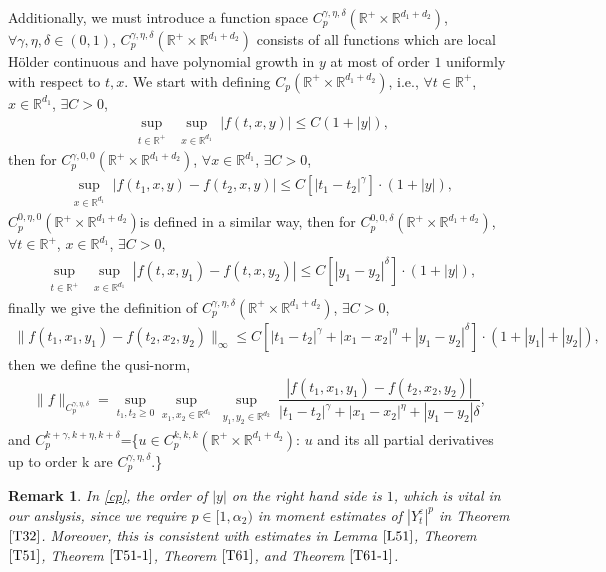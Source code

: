 \documentclass[11pt,reqno]{amsart}
\newtheorem{remark}{\indent Remark}[section]
\numberwithin{equation}{section}
\newcommand{\R}{\mathbb{R}}
\newcommand{\ga}{\gamma}
\newcommand{\de}{\delta}
\newcommand{\mb}{\mathbb}
\begin{document}
Additionally, we must introduce a function space $C^{\gamma,\eta,\delta}_p(\mb{R}^{+}\times\mathbb{R}^{d_{1}+d_{2}})$, $\forall \gamma, \eta, \delta\in(0,1)$,  $C^{\gamma,\eta,\delta}_p(\mb{R}^{+}\times\mathbb{R}^{d_{1}+d_{2}})$ consists of all functions which are local H\"{o}lder continuous and have polynomial growth in $y$ at most of order $1$ uniformly with respect to $t, x$.   We start with defining  $C_p(\mb{R}^{+}\times\mathbb{R}^{d_{1}+d_{2}})$, i.e., $\forall t\in \R^{+}$, $ x\in \R^{d_{1}}$,  $\exists C>0$, 
\begin{align*}
	\sup_{\substack{t\in \R^{+}}}\sup_{\substack{x\in \R^{d_{1}}}}|f(t,x,y)|\leq C (1+|y|),
\end{align*}
then for $C^{\gamma,0,0}_p(\mb{R}^{+}\times\mathbb{R}^{d_{1}+d_{2}})$, $\forall x\in \R^{d_{1}}$, $\exists C>0$,  
\begin{align*}
	\sup_{\substack{x\in \R^{d_{1}}}}|f(t_{1},x,y)-f(t_{2},x,y)|\leq C [|t_{1}-t_{2}|^{\ga}]\cdot(1+|y|),
\end{align*}
$ C^{0,\eta,0}_p(\mb{R}^{+}\times\mathbb{R}^{d_{1}+d_{2}})$is defined in a similar way, then for $ C^{0,0,\de}_p(\mb{R}^{+}\times\mathbb{R}^{d_{1}+d_{2}})$,$\forall t\in \R^{+}$, $x\in \R^{d_{1}}$,  $\exists C>0$,
\begin{align*}
	\sup_{\substack{t\in \R^{+}}}\sup_{\substack{x\in \R^{d_{1}}}}|f(t,x,y_{1})-f(t,x,y_{2})|\leq C [|y_{1}-y_{2}|^{\de}]\cdot(1+|y|),
\end{align*}
finally we give the definition of $C^{\gamma,\eta,\delta}_p(\mb{R}^{+}\times\mathbb{R}^{d_{1}+d_{2}})$, $\exists C>0$,
\begin{align}\label{cp}
	\|f(t_{1},x_{1},y_{1})-f(t_{2},x_{2},y_{2})\|_{\infty}\leq C [|t_{1}-t_{2}|^{\ga}+|x_{1}-x_{2}|^{\eta}+|y_{1}-y_{2}|^{\delta}]\cdot(1+|y_{1}|+|y_{2}|),
\end{align}
then we define the qusi-norm, 
\begin{align*}
	\|f\|_{C^{\gamma,\eta,\delta}_p}=\sup_{t_{1},t_{2}\geq0}\sup_{x_{1},x_{2}\in\mathbb{R}^{d_{1}}}\sup_{\substack{y_{1},y_{2}\in \mathbb{R}^{d_{2}}}}\dfrac{	|f(t_{1},x_{1},y_{1})-f(t_{2},x_{2},y_{2})|}{|t_{1}-t_{2}|^{\gamma}+|x_{1}-x_{2}|^\eta+|y_{1}-y_{2}|\delta},
\end{align*}
and $C^{k+\gamma,k+\eta,k+\delta}_p$=\{$u\in  C^{k,k,k}_{p}(\mb{R}^{+}\times\mathbb{R}^{d_{1}+d_{2}})$: $u$ and its all  partial derivatives up to order k are $C^{\gamma,\eta,\delta}_p$.\}
\begin{remark}
In \eqref{cp}, the order of $|y|$ on the right hand side is $1$, which is vital in our anslysis, since we require $p\in[1,\alpha_{2})$ in moment estimates of $|Y_{t}^{\varepsilon}|^{p}$ in Theorem $\ref{T32}$. Moreover, this is consistent with estimates in Lemma $\ref{L51}$, Theorem $\ref{T51}$, Theorem $\ref{T51-1}$, Theorem $\ref{T61}$,  and Theorem $\ref{T61-1}$.
\end{remark}
\end{document}
